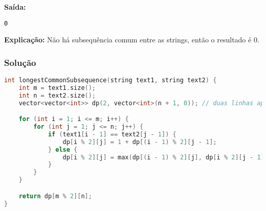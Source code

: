\textbf{Saída:}
\begin{verbatim}
0
\end{verbatim}

\textbf{Explicação:} Não há subsequência comum entre as strings, então o resultado é 0.

\subsubsection*{Solução}
\begin{lstlisting}[language=C++]
int longestCommonSubsequence(string text1, string text2) {
    int m = text1.size();
    int n = text2.size();
    vector<vector<int>> dp(2, vector<int>(n + 1, 0)); // duas linhas apenas

    for (int i = 1; i <= m; i++) {
        for (int j = 1; j <= n; j++) {
            if (text1[i - 1] == text2[j - 1]) {
                dp[i % 2][j] = 1 + dp[(i - 1) % 2][j - 1];
            } else {
                dp[i % 2][j] = max(dp[(i - 1) % 2][j], dp[i % 2][j - 1]);
            }
        }
    }

    return dp[m % 2][n];
}
\end{lstlisting}

